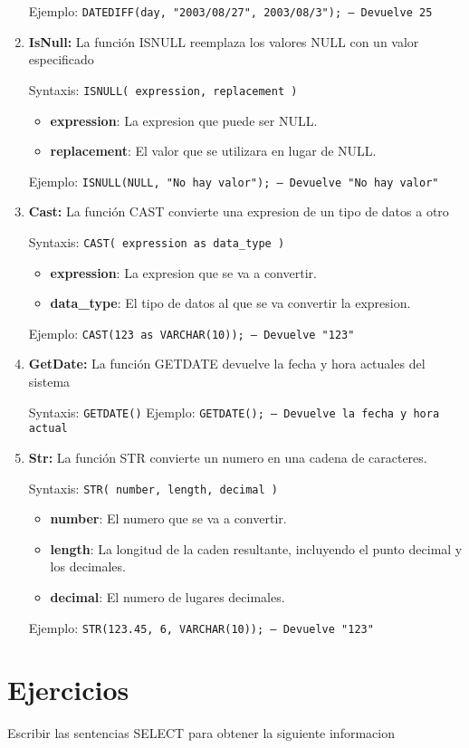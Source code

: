 \documentclass[a4paper,openany,11pt]{article}
\newcommand\skiplines[1]{\vspace{#1\baselineskip}}
\begin{document}
\begin{enumerate}
        Ejemplo: \texttt{DATEDIFF(day, "2003/08/27", 2003/08/3"); -- Devuelve 25}

    \skiplines{1}
    \item \textbf{IsNull:}
        La función ISNULL reemplaza los valores NULL con un valor especificado

        Syntaxis: \texttt{ISNULL( expression, replacement )}
        \begin{itemize}
            \item \textbf{expression}: La expresion que puede ser NULL.
            \item \textbf{replacement}: El valor que se utilizara en lugar de NULL.
        \end{itemize}

        Ejemplo: \texttt{ISNULL(NULL, "No hay valor"); -- Devuelve "No hay valor"}

    \skiplines{1}
    \item \textbf{Cast:}
        La función CAST convierte una expresion de un tipo de datos a otro

        Syntaxis: \texttt{CAST( expression as data_type )}
        \begin{itemize}
            \item \textbf{expression}: La expresion que se va a convertir.
            \item \textbf{data\_type}: El tipo de datos al que se va convertir
                la expresion.
        \end{itemize}

        Ejemplo: \texttt{CAST(123 as VARCHAR(10)); -- Devuelve "123"}

    \skiplines{1}
    \item \textbf{GetDate:}
        La función GETDATE devuelve la fecha y hora actuales del sistema

        Syntaxis: \texttt{GETDATE()}
        Ejemplo: \texttt{GETDATE(); -- Devuelve la fecha y hora actual}

    \skiplines{1}
    \item \textbf{Str:}
        La función STR convierte un numero en una cadena de caracteres.

        Syntaxis: \texttt{STR( number, length, decimal )}
        \begin{itemize}
            \item \textbf{number}: El numero que se va a convertir.
            \item \textbf{length}: La longitud de la caden resultante,
                incluyendo el punto decimal y los decimales.
            \item \textbf{decimal}: El numero de lugares decimales.
        \end{itemize}

        Ejemplo: \texttt{STR(123.45, 6, VARCHAR(10)); -- Devuelve "123"}
\end{enumerate}

\section[5.2]{Ejercicios}
Escribir las sentencias SELECT para obtener la siguiente informacion


\end{document}
